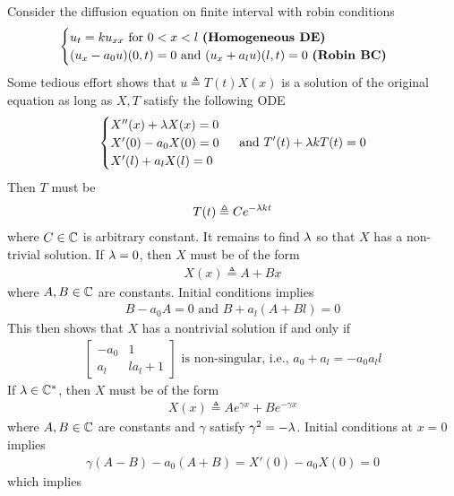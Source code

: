 \documentclass{report}
\begin{document}
\begin{mdframed}
Consider the diffusion equation on finite interval with robin conditions 
\begin{align*}
\begin{cases}
  u_t=ku_{xx}\text{ for }0<x<l\text{ \textbf{(Homogeneous DE)} }\\
  (u_x-a_0u)(0,t)=0\text{ and }(u_x+a_lu)(l,t)=0\text{ \textbf{(Robin BC)} }
\end{cases}
\end{align*}
Some tedious effort shows that $u\triangleq T(t)X(x)$ is a solution of the original equation as long as $X,T$ satisfy the following ODE 
 \begin{align*}
\begin{cases}
  X''(x)+\lambda  X(x)=0\\
  X'(0)-a_0X(0)=0 \\
  X'(l)+a_lX(l)=0
\end{cases}\text{ and }T'(t)+\lambda  k T(t)=0
\end{align*}
Then $T$ must be
\begin{align*}
T(t)\triangleq  C e^{- \lambda  kt }
\end{align*}
where $C\in\mathbb{C}$ is arbitrary constant. It remains to find $\lambda $ so that $X$ has a non-trivial solution. If $\lambda =0$, then $X$ must be of the form
\begin{align*}
X(x)\triangleq A+Bx
\end{align*}
where $A,B \in\mathbb{C}$ are constants. Initial conditions implies 
\begin{align*}
B-a_0A=0\text{ and }B+a_l(A+Bl)=0
\end{align*}
This then shows that $X$ has a nontrivial solution if and only if 
\begin{align*}
\begin{bmatrix}
  -a_0 & 1 \\
  a_l & la_l+1
\end{bmatrix}\text{ is non-singular, i.e., }a_0+a_l=-a_0a_ll
\end{align*}
If $\lambda \in\mathbb{C}^*$, then $X$ must be of the form 
\begin{align*}
X(x)\triangleq A e^{\gamma x}+Be^{-\gamma x}
\end{align*}
where $A,B \in\mathbb{C}$ are constants and $\gamma $ satisfy $\gamma ^2=-\lambda $. Initial conditions at $x=0$ implies 
\begin{align*}
\gamma  (A-B)-a_0(A+B)=X'(0)-a_0X(0)=0
\end{align*}
which implies 
\begin{align*}

\end{align*}
\end{mdframed}
\end{document}
